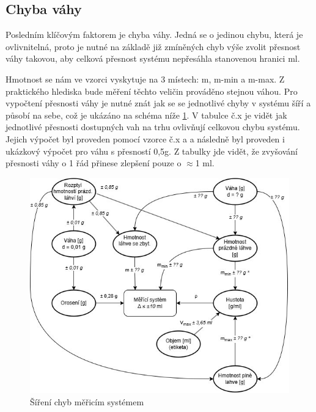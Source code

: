 \subsection{Chyba váhy}
Posledním klíčovým faktorem je chyba váhy. Jedná se o jedinou chybu, která je ovlivnitelná, proto je nutné na základě již zmíněných chyb výše zvolit přesnost váhy takovou, aby celková přesnost systému nepřesáhla stanovenou hranici  ml. 


Hmotnost se nám ve vzorci vyskytuje na 3 místech: m, m-min a m-max. Z praktického hlediska bude měření těchto veličin prováděno stejnou váhou. Pro vypočtení přesnosti váhy je nutné znát jak se se jednotlivé chyby v systému šíří a působí na sebe, což je ukázáno na schéma níže \ref{chyby}. V tabulce č.x je vidět jak jednotlivé přesnosti dostupných vah na trhu ovlivňují celkovou chybu systému. Jejich výpočet byl proveden pomocí vzorce č.x a a následně byl proveden i ukázkový výpočet pro váhu s přesností 0,5g. Z tabulky jde vidět, že zvyšování přesnosti váhy o 1 řád přinese zlepšení pouze o $\approx$1 ml.

\begin{figure}[H]
    \begin{center}
        \includegraphics[scale=0.9]{obrazky/Propagace nejistot-Metoda1++.jpg}
    \end{center}
    \caption{Šíření chyb měřicím systémem}
    \label{chyby}
\end{figure}

